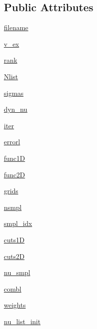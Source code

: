 \subsection*{Public Attributes}
\begin{DoxyCompactItemize}
\item 
\hyperlink{class_a_l_s_1_1_a_l_sclass_1_1_a_l_s_c_p_d_a06ec8d46dbcfa51cf478c7bec4dfea13}{filename}
\item 
\hyperlink{class_a_l_s_1_1_a_l_sclass_1_1_a_l_s_c_p_d_ab40ad1c47e031156f30bcb05e9674e65}{v\+\_\+ex}
\item 
\hyperlink{class_a_l_s_1_1_a_l_sclass_1_1_a_l_s_c_p_d_ab8760319e168e48cfee2211907ea71eb}{rank}
\item 
\hyperlink{class_a_l_s_1_1_a_l_sclass_1_1_a_l_s_c_p_d_ab993023a1119fca352240c9ef1293cde}{Nlist}
\item 
\hyperlink{class_a_l_s_1_1_a_l_sclass_1_1_a_l_s_c_p_d_a0494e5d18326012bedd9f9dd1bd4e013}{sigmas}
\item 
\hyperlink{class_a_l_s_1_1_a_l_sclass_1_1_a_l_s_c_p_d_a2bbaf24f35dc7923372fb0305f197351}{dyn\+\_\+nu}
\item 
\hyperlink{class_a_l_s_1_1_a_l_sclass_1_1_a_l_s_c_p_d_a931867f5a56c1d9bb37d7114055b04e4}{iter}
\item 
\hyperlink{class_a_l_s_1_1_a_l_sclass_1_1_a_l_s_c_p_d_a1f64a6546e3361f23494f11a285f2ce3}{errorl}
\item 
\hyperlink{class_a_l_s_1_1_a_l_sclass_1_1_a_l_s_c_p_d_ae2e084ba9c88b40b3cc2139b2856f7d7}{func1\+D}
\item 
\hyperlink{class_a_l_s_1_1_a_l_sclass_1_1_a_l_s_c_p_d_a509a6a83fceb45c4f2d7406c70e218f3}{func2\+D}
\item 
\hyperlink{class_a_l_s_1_1_a_l_sclass_1_1_a_l_s_c_p_d_a472110e2d9846319e55db59f78312dab}{grids}
\item 
\hyperlink{class_a_l_s_1_1_a_l_sclass_1_1_a_l_s_c_p_d_a6b11d8a1e8f3535f15c4846bc1ac1408}{nsmpl}
\item 
\hyperlink{class_a_l_s_1_1_a_l_sclass_1_1_a_l_s_c_p_d_a1e00c73206d38264f46046925fd675c3}{smpl\+\_\+idx}
\item 
\hyperlink{class_a_l_s_1_1_a_l_sclass_1_1_a_l_s_c_p_d_ad15383d966830d360c1f465e86670834}{cuts1\+D}
\item 
\hyperlink{class_a_l_s_1_1_a_l_sclass_1_1_a_l_s_c_p_d_abfc1593ee7b4559f8a0e6b434e017884}{cuts2\+D}
\item 
\hyperlink{class_a_l_s_1_1_a_l_sclass_1_1_a_l_s_c_p_d_a1e0a456a4cbcfdbf019260766e532045}{nu\+\_\+smpl}
\item 
\hyperlink{class_a_l_s_1_1_a_l_sclass_1_1_a_l_s_c_p_d_a03d7f0dc0293cf32543f53a3eeb04333}{combl}
\item 
\hyperlink{class_a_l_s_1_1_a_l_sclass_1_1_a_l_s_c_p_d_a07adddd4720dba6e1a8d3187174023a7}{weights}
\item 
\hyperlink{class_a_l_s_1_1_a_l_sclass_1_1_a_l_s_c_p_d_ac02a6d72f40ba47edc3e0810f2dc5d13}{nu\+\_\+list\+\_\+init}
\end{DoxyCompactItemize}


